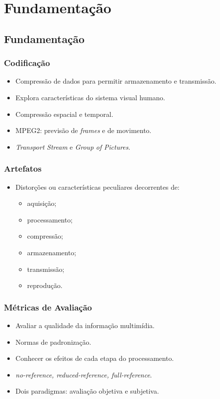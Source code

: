 \section{Fundamentação}

% 
\subsection{Fundamentação}
    \begin{frame}\frametitle{Codificação}
        \begin{itemize}
            \item Compressão de dados para permitir armazenamento e transmissão.
            \item Explora características do sistema visual humano.
            \item Compressão espacial e temporal.
            \item MPEG2: previsão de \emph{frames} e de movimento.
            \item \emph{Transport Stream} e \emph{Group of Pictures}.
        \end{itemize}
    \end{frame}

    \begin{frame}\frametitle{Artefatos}
        \begin{itemize}
            \item Distorções ou características peculiares decorrentes de:
            \begin{itemize}
                \item aquisição;
                \item processamento;
                \item compressão;
                \item armazenamento;
                \item transmissão;
                \item reprodução.
            \end{itemize}
        \end{itemize}
    \end{frame}

    \begin{frame}\frametitle{Métricas de Avaliação}
        \begin{itemize}
            \item Avaliar a qualidade da informação multimídia. %
            \item Normas de padronização.
            \item Conhecer os efeitos de cada etapa do processamento.
            \item \emph{no-reference, reduced-reference, full-reference}.
            \item Dois paradigmas: avaliação objetiva e subjetiva.
        \end{itemize}
    \end{frame}
    
